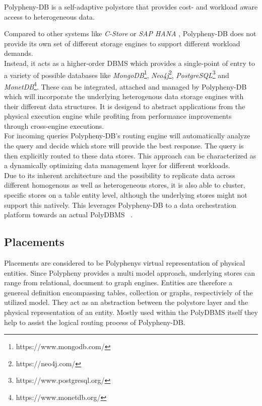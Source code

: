 Polypheny-DB is a self-adaptive polystore that provides cost- and workload aware access to heterogeneous data\cite{poly2020}.

Compared to other systems like \textit{C-Store}\cite{cstore_2005} or \textit{SAP HANA} \cite{hana_2012}, 
Polypheny-DB does not provide its own set of different storage engines to support 
different workload demands.\\
Instead, it acts as a higher-order DBMS which provides a single-point of entry to 
a variety of possible databases like 
\textit{MongoDB}\footnote{https://www.mongodb.com/}, 
\textit{Neo4j}\footnote{https://neo4j.com/},
\textit{PostgreSQL}\footnote{https://www.postgresql.org/} 
and \textit{MonetDB}\footnote{https://www.monetdb.org/}. 
These can be integrated, attached and managed by Polypheny-DB which will incorporate the underlying 
heterogenous data storage engines with their different data structures. 
It is desigend to abstract applications from the physical execution engine while profiting from 
performance improvements through cross-engine executions. 
\\
For incoming queries Polypheny-DB's routing engine will automatically analyze the query and decide 
which store will provide the best response. The query is then explicitly routed to these data stores. 
This approach can be characterized as a dynamically optimizing data management layer for different workloads.\\
Due to its inherent architecture and the possibility to replicate data across different homogenous as well as heterogeneous stores, it is also able to cluster, specific stores 
on a table entity level, although the underlying stores might not support this natively. 
This leverages Polypheny-DB to a data orchestration platform towards an actual PolyDBMS ~\cite{polypheny2021}. 





\subsection{Placements}
Placements are considered to be Polyphenys virtual representation of physical entities.
Since Polypheny provides a multi model approach, underlying stores can range from relational, document to graph engines. 
Entities are therefore a genereal definition encompassing tables, collection or graphs, respectiviely of the utilized model.
They act as an abstraction between the polystore layer and the physical representation of an entity. 
Mostly used within the PolyDBMS itself they help to assist the logical routing process of Polypheny-DB.

